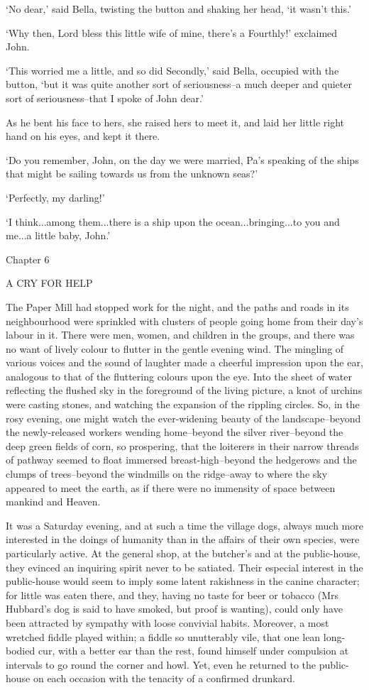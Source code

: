 ‘No dear,’ said Bella, twisting the button and shaking her head, ‘it
wasn’t this.’

‘Why then, Lord bless this little wife of mine, there’s a Fourthly!’
exclaimed John.

‘This worried me a little, and so did Secondly,’ said Bella, occupied
with the button, ‘but it was quite another sort of seriousness--a much
deeper and quieter sort of seriousness--that I spoke of John dear.’

As he bent his face to hers, she raised hers to meet it, and laid her
little right hand on his eyes, and kept it there.

‘Do you remember, John, on the day we were married, Pa’s speaking of the
ships that might be sailing towards us from the unknown seas?’

‘Perfectly, my darling!’

‘I think...among them...there is a ship upon the ocean...bringing...to
you and me...a little baby, John.’



Chapter 6

A CRY FOR HELP


The Paper Mill had stopped work for the night, and the paths and roads
in its neighbourhood were sprinkled with clusters of people going home
from their day’s labour in it. There were men, women, and children in
the groups, and there was no want of lively colour to flutter in the
gentle evening wind. The mingling of various voices and the sound of
laughter made a cheerful impression upon the ear, analogous to that of
the fluttering colours upon the eye. Into the sheet of water reflecting
the flushed sky in the foreground of the living picture, a knot of
urchins were casting stones, and watching the expansion of the rippling
circles. So, in the rosy evening, one might watch the ever-widening
beauty of the landscape--beyond the newly-released workers wending
home--beyond the silver river--beyond the deep green fields of corn, so
prospering, that the loiterers in their narrow threads of pathway seemed
to float immersed breast-high--beyond the hedgerows and the clumps of
trees--beyond the windmills on the ridge--away to where the sky appeared
to meet the earth, as if there were no immensity of space between
mankind and Heaven.

It was a Saturday evening, and at such a time the village dogs, always
much more interested in the doings of humanity than in the affairs of
their own species, were particularly active. At the general shop, at
the butcher’s and at the public-house, they evinced an inquiring spirit
never to be satiated. Their especial interest in the public-house would
seem to imply some latent rakishness in the canine character; for little
was eaten there, and they, having no taste for beer or tobacco (Mrs
Hubbard’s dog is said to have smoked, but proof is wanting), could only
have been attracted by sympathy with loose convivial habits. Moreover,
a most wretched fiddle played within; a fiddle so unutterably vile, that
one lean long-bodied cur, with a better ear than the rest, found himself
under compulsion at intervals to go round the corner and howl. Yet, even
he returned to the public-house on each occasion with the tenacity of a
confirmed drunkard.

